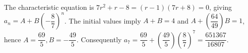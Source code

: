 The characteristic equation is $7r^2+r-8=(r-1)(7r+8)=0$, giving $a_n=A+B(-\dfrac{8}{7})^n$. The initial values imply $A+B=4$ and $A+(\dfrac{64}{49})B=1$, hence $A=\dfrac{69}{5},B=-\dfrac{49}{5}$. Consequently $a_7=\dfrac{69}{5}+(\dfrac{49}{5})(\dfrac{8}{7})^7=\boxed{\dfrac{651367}{16807}}$.
